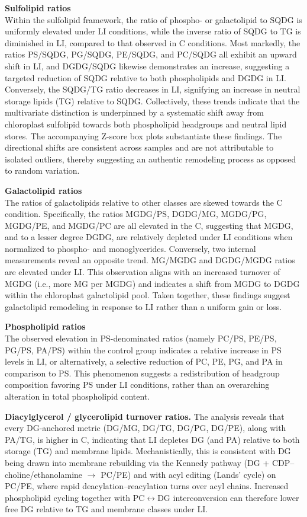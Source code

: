\documentclass[10pt,letterpaper]{article}
\begin{document}
\textbf{Sulfolipid ratios}  \\
Within the sulfolipid framework, the ratio of phospho- or galactolipid to SQDG is uniformly elevated under LI conditions, while the inverse ratio of SQDG to TG is diminished in LI, compared to that observed in C conditions. Most markedly, the ratios PS/SQDG, PG/SQDG, PE/SQDG, and PC/SQDG all exhibit an upward shift in LI, and DGDG/SQDG likewise demonstrates an increase, suggesting a targeted reduction of SQDG relative to both phospholipids and DGDG in LI. Conversely, the SQDG/TG ratio decreases in LI, signifying an increase in neutral storage lipids (TG) relative to SQDG. Collectively, these trends indicate that the multivariate distinction is underpinned by a systematic shift away from chloroplast sulfolipid towards both phospholipid headgroups and neutral lipid stores. The accompanying Z-score box plots substantiate these findings. The directional shifts are consistent across samples and are not attributable to isolated outliers, thereby suggesting an authentic remodeling process as opposed to random variation.

\textbf{Galactolipid ratios}  \\
The ratios of galactolipids relative to other classes are skewed towards the C condition. Specifically, the ratios MGDG/PS, DGDG/MG, MGDG/PG, MGDG/PE, and MGDG/PC are all elevated in the C, suggesting that MGDG, and to a lesser degree DGDG, are relatively depleted under LI conditions when normalized to phospho- and monoglycerides. Conversely, two internal measurements reveal an opposite trend. MG/MGDG and DGDG/MGDG ratios are elevated under LI. This observation aligns with an increased turnover of MGDG (i.e., more MG per MGDG) and indicates a shift from MGDG to DGDG within the chloroplast galactolipid pool. Taken together, these findings suggest galactolipid remodeling in response to LI rather than a uniform gain or loss.

\textbf{Phospholipid ratios}  \\
The observed elevation in PS-denominated ratios (namely PC/PS, PE/PS, PG/PS, PA/PS) within the control group indicates a relative increase in PS levels in LI, or alternatively, a selective reduction of PC, PE, PG, and PA in comparison to PS. This phenomenon suggests a redistribution of headgroup composition favoring PS under LI conditions, rather than an overarching alteration in total phospholipid content.

\textbf{Diacylglycerol / glycerolipid turnover ratios.}
The analysis reveals that every DG-anchored metric (DG/MG, DG/TG, DG/PG, DG/PE), along with PA/TG, is higher in C, indicating that LI depletes DG (and PA) relative to both storage (TG) and membrane lipids. Mechanistically, this is consistent with DG being drawn into membrane rebuilding via the Kennedy pathway (DG + CDP--choline/ethanolamine $\rightarrow$ PC/PE) and with acyl editing (Lands' cycle) on PC/PE, where rapid deacylation--reacylation turns over acyl chains. Increased phospholipid cycling together with PC$\leftrightarrow$DG interconversion can therefore lower free DG relative to TG and membrane classes under LI.
\end{document}
